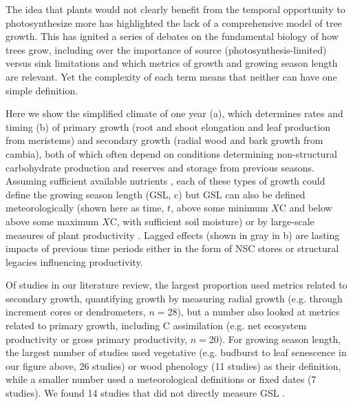 \documentclass[11pt]{article}
\newcommand{\R}[1]{\label{#1}\linelabel{#1}}
\begin{document}
\R{forbigKref2S}The idea that plants would not clearly benefit from the temporal opportunity to photosynthesize more has highlighted the lack of a comprehensive model of tree growth. This has ignited a series of debates on the fundamental biology of how trees grow, including over the importance of source (photosynthesis-limited) versus sink limitations \citep[plant growth-limited, but often via temperature, biophysical constraints, nutrients, and other arguably external factors,][]{korner2015paradigm,fatichi2019modelling,rademacher2022insights,cabon2022cross}\R{forbigKref2E} and which metrics of growth and growing season length are relevant. Yet the complexity of each term means that neither can have one simple definition. 

Here we show the simplified climate of one year (a), which determines rates and timing (b) of primary growth (root and shoot elongation and leaf production from meristems) and secondary growth (radial wood and bark growth from cambia), both of which often depend on conditions determining non-structural carbohydrate \citep[NSC, which are sugars and starch needed for growth and an important area of study, for more details see][]{hartmann2016understanding,martinez2016dynamics,tixier2020comparison,luo2024internal} production and reserves and storage from previous seasons. \R{forbigKNUTS1}Assuming sufficient available nutrients \citep{korner2015paradigm}, each of these types of growth could define the growing season length (GSL, c) but GSL can also be defined meteorologically (shown here as time, $t$, above some minimum $X$\degree C and below above some maximum $X$\degree C, with sufficient soil moisture) or by large-scale measures of plant productivity \citep{korner2023four}. Lagged effects (shown in gray in b) are lasting impacts of previous time periods either in the form of NSC stores or structural legacies influencing productivity. 

Of studies in our literature review, the largest proportion used metrics related to secondary growth, quantifying growth by measuring radial growth (e.g. through increment cores or dendrometers, $n=$28), but a number also looked at metrics related to primary growth, including C assimilation (e.g. net ecosystem productivity or gross primary productivity, $n=$20). For growing season length, the largest number of studies used vegetative (e.g. budburst to leaf senescence in our figure above, 26 studies) or wood phenology (11 studies) as their definition, while a smaller number used a meteorological definitions or fixed dates (7 studies). We found 14 studies that did not directly measure GSL \citep[e.g.][]{zhu2021different,dow2022warm,zohner2023effect}. 
\end{document}
